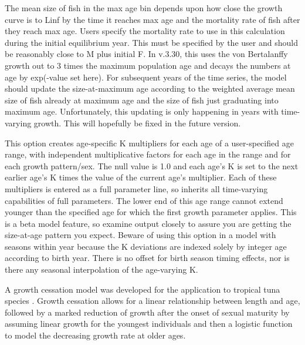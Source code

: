	
The mean size of fish in the max age bin depends upon how close the growth curve is to Linf by the time it reaches max age and the mortality rate of fish after they reach max age. Users specify the mortality rate to use in this calculation during the initial equilibrium year. This must be specified by the user and should be reasonably close to M plus initial F. In v.3.30, this uses the von Bertalanffy growth out to 3 times the maximum population age and decays the numbers at age by exp(-value set here). For subsequent years of the time series, the model should update the size-at-maximum age according to the weighted average mean size of fish already at maximum age and the size of fish just graduating into maximum age. Unfortunately, this updating is only happening in years with time-varying growth. This will hopefully be fixed in the future version.
	
This option creates age-specific K multipliers for each age of a user-specified age range, with independent multiplicative factors for each age in the range and for each growth pattern/sex. The null value is 1.0 and each age's K is set to the next earlier age's K times the value of the current age's multiplier. Each of these multipliers is entered as a full parameter line, so inherits all time-varying capabilities of full parameters. The lower end of this age range cannot extend younger than the specified age for which the first growth parameter applies. This is a beta model feature, so examine output closely to assure you are getting the size-at-age pattern you expect. Beware of using this option in a model with seasons within year because the K deviations are indexed solely by integer age according to birth year. There is no offset for birth season timing effects, nor is there any seasonal interpolation of the age-varying K.

\hypertarget{GrowthCessation}{}
A growth cessation model was developed for the application to tropical tuna species \citep{maunder-growth-2018}. Growth cessation allows for a linear relationship between length and age, followed by a marked reduction of growth after the onset of sexual maturity by assuming linear growth for the youngest individuals and then a logistic function to model the decreasing growth rate at older ages.

